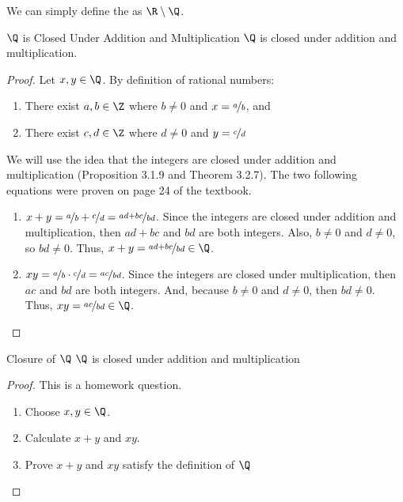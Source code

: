 \documentclass[letterpaper,12pt]{report}
\begin{document}
We can simply define the  as $\R \setminus \Q$.

\begin{thmbox}{$\Q$ is Closed Under Addition and Multiplication}{}
	$\Q$ is closed under addition and multiplication.
	\tcblower
	\begin{proof}
		Let $x,y \in \Q$. By definition of rational numbers:
		\begin{enumerate}
			\item There exist $a,b \in \Z$ where $b \neq 0$ and $x = \nicefrac{a}{b}$, and
			\item There exist $c, d \in \Z$ where $d \neq 0 $ and $y = \nicefrac{c}{d}$
		\end{enumerate}

		We will use the idea that the integers are closed under addition and multiplication (Proposition 3.1.9 and Theorem 3.2.7). The two following equations were proven on page 24 of the textbook.

		\begin{enumerate}
			\item $x+y = \nicefrac{a}{b} + \nicefrac{c}{d} = \nicefrac{ad + bc}{bd}$. Since the integers are closed under addition and multiplication, then $ad+bc$ and $bd$ are both integers. Also, $b \neq 0$ and $d \neq 0$, so $bd \neq 0$. Thus, $x+y = \nicefrac{ad+bc}{bd} \in \Q$.
			\item $xy = \nicefrac{a}{b} \cdot \nicefrac{c}{d} = \nicefrac{ac}{bd}$. Since the integers are closed under multiplication, then $ac$ and $bd$ are both integers. And, because $b \neq 0$ and $d \neq 0$, then $bd \neq 0$. Thus, $xy = \nicefrac{ac}{bd} \in \Q$.
		\end{enumerate}
	\end{proof}
\end{thmbox}


\iffalse
\begin{thmbox}{Closure of $\Q$}{}
	$\Q$ is closed under addition and multiplication
	\tcblower
	\begin{proof}
		This is a homework question.
		\begin{enumerate}
			\item Choose $x,y \in \Q$.
			\item Calculate $x+y$ and $xy$.
			\item Prove $x+y$ and $xy$ satisfy the definition of $\Q$
		\end{enumerate}
	\end{proof}
\end{thmbox}
\end{document}
